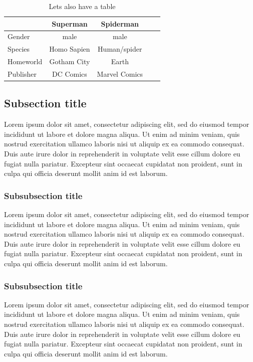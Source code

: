 \begin{table}
\caption{Lets also have a table}
\centering
\begin{tabular}{lcccc}
\toprule
& Superman & Spiderman\\
\midrule
Gender & male & male\\
Species 	& Homo Sapien 	& Human/spider\\
Homeworld 	& Gotham City 	& Earth\\
\midrule
Publisher 	& DC Comics 	& Marvel Comics\\
\bottomrule
\end{tabular}
\end{table}


\subsection{Subsection title}
Lorem ipsum dolor sit amet, consectetur adipiscing elit, sed do eiusmod tempor incididunt ut labore et dolore magna aliqua. Ut enim ad minim veniam, quis nostrud exercitation ullamco laboris nisi ut aliquip ex ea commodo consequat. Duis aute irure dolor in reprehenderit in voluptate velit esse cillum dolore eu fugiat nulla pariatur. Excepteur sint occaecat cupidatat non proident, sunt in culpa qui officia deserunt mollit anim id est laborum.

\subsubsection{Subsubsection title}
Lorem ipsum dolor sit amet, consectetur adipiscing elit, sed do eiusmod tempor incididunt ut labore et dolore magna aliqua. Ut enim ad minim veniam, quis nostrud exercitation ullamco laboris nisi ut aliquip ex ea commodo consequat. Duis aute irure dolor in reprehenderit in voluptate velit esse cillum dolore eu fugiat nulla pariatur. Excepteur sint occaecat cupidatat non proident, sunt in culpa qui officia deserunt mollit anim id est laborum.

\subsubsection{Subsubsection title}
Lorem ipsum dolor sit amet, consectetur adipiscing elit, sed do eiusmod tempor incididunt ut labore et dolore magna aliqua. Ut enim ad minim veniam, quis nostrud exercitation ullamco laboris nisi ut aliquip ex ea commodo consequat. Duis aute irure dolor in reprehenderit in voluptate velit esse cillum dolore eu fugiat nulla pariatur. Excepteur sint occaecat cupidatat non proident, sunt in culpa qui officia deserunt mollit anim id est laborum.


